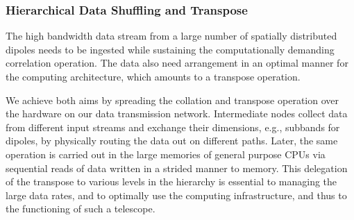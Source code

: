 \documentclass{ws-jai}
\begin{document}
\subsubsection   {Hierarchical  Data   Shuffling  and  Transpose}
The high  bandwidth data  stream from  a large  number of  spatially distributed
dipoles  needs to  be ingested  while sustaining  the computationally  demanding
correlation operation. The  data also need arrangement in an  optimal manner for
the computing architecture, which amounts to a transpose operation.

We achieve both aims by spreading the collation and transpose operation over the
hardware on our data transmission  network. Intermediate nodes collect data from
different  input  streams and  exchange  their  dimensions, e.g.,  subbands  for
dipoles, by physically routing the data  out on different paths. Later, the same
operation  is carried  out in  the large  memories of  general purpose  CPUs via
sequential reads of data written in a strided manner to memory.  This delegation
of the transpose to various levels in the hierarchy is essential to managing the
large data rates, and to optimally use the computing infrastructure, and thus to
the functioning of such a telescope.

\end{document}
